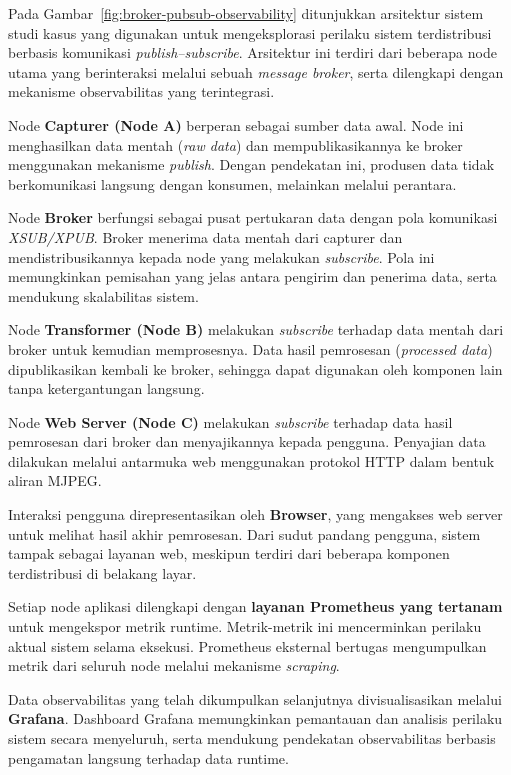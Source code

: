 Pada Gambar~\ref{fig:broker-pubsub-observability} ditunjukkan arsitektur sistem studi kasus yang digunakan untuk mengeksplorasi perilaku sistem terdistribusi berbasis komunikasi \emph{publish--subscribe}. Arsitektur ini terdiri dari beberapa node utama yang berinteraksi melalui sebuah \emph{message broker}, serta dilengkapi dengan mekanisme observabilitas yang terintegrasi.

Node \textbf{Capturer (Node A)} berperan sebagai sumber data awal. Node ini menghasilkan data mentah (\emph{raw data}) dan mempublikasikannya ke broker menggunakan mekanisme \emph{publish}. Dengan pendekatan ini, produsen data tidak berkomunikasi langsung dengan konsumen, melainkan melalui perantara.

Node \textbf{Broker} berfungsi sebagai pusat pertukaran data dengan pola komunikasi \emph{XSUB/XPUB}. Broker menerima data mentah dari capturer dan mendistribusikannya kepada node yang melakukan \emph{subscribe}. Pola ini memungkinkan pemisahan yang jelas antara pengirim dan penerima data, serta mendukung skalabilitas sistem.

Node \textbf{Transformer (Node B)} melakukan \emph{subscribe} terhadap data mentah dari broker untuk kemudian memprosesnya. Data hasil pemrosesan (\emph{processed data}) dipublikasikan kembali ke broker, sehingga dapat digunakan oleh komponen lain tanpa ketergantungan langsung.

Node \textbf{Web Server (Node C)} melakukan \emph{subscribe} terhadap data hasil pemrosesan dari broker dan menyajikannya kepada pengguna. Penyajian data dilakukan melalui antarmuka web menggunakan protokol HTTP dalam bentuk aliran MJPEG.

Interaksi pengguna direpresentasikan oleh \textbf{Browser}, yang mengakses web server untuk melihat hasil akhir pemrosesan. Dari sudut pandang pengguna, sistem tampak sebagai layanan web, meskipun terdiri dari beberapa komponen terdistribusi di belakang layar.

Setiap node aplikasi dilengkapi dengan \textbf{layanan Prometheus yang tertanam} untuk mengekspor metrik runtime. Metrik-metrik ini mencerminkan perilaku aktual sistem selama eksekusi. Prometheus eksternal bertugas mengumpulkan metrik dari seluruh node melalui mekanisme \emph{scraping}.

Data observabilitas yang telah dikumpulkan selanjutnya divisualisasikan melalui \textbf{Grafana}. Dashboard Grafana memungkinkan pemantauan dan analisis perilaku sistem secara menyeluruh, serta mendukung pendekatan observabilitas berbasis pengamatan langsung terhadap data runtime.

